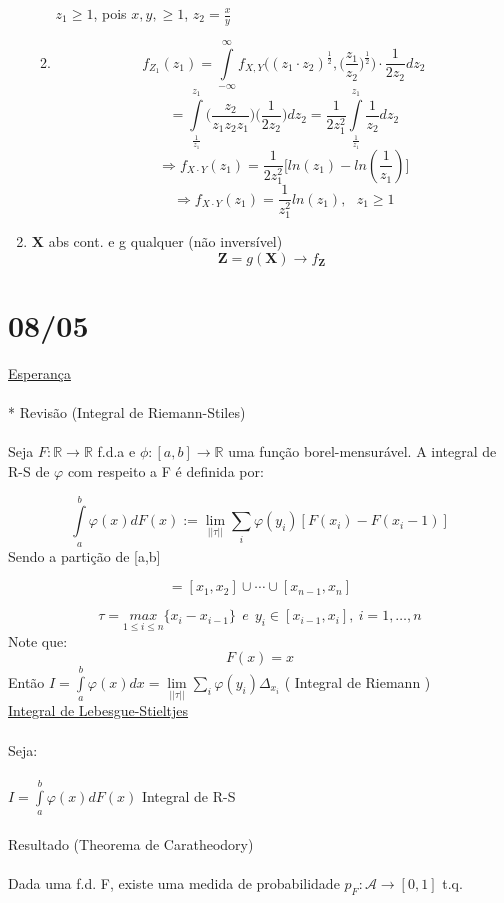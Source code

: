 \documentclass[a4paper,12pt]{article}
\begin{document}
\begin{enumerate}
\begin{enumerate}[label=\alph*)]
	$z_1\ge 1$, pois $x,y,\ge1$, $z_2=\frac{x}{y}$
	\item 
	$$f_{Z_1}(z_1)= \int\limits_{-\infty}^{\infty}f_{X,Y}\bigg(
	(z_1\cdot z_2)^{\frac{1}{2}},\bigg(\frac{z_1}{z_2}\bigg)^{\frac{1}{2}}
	\bigg)\cdot 
	\frac{1}{2z_2}dz_2
$$
$$
=\int\limits_{\frac{1}{z_1}}^{z_1} \bigg(
	\frac{z_2}{z_1z_2z_1}
	\bigg)
	\bigg(
	\frac{1}{2z_2}
	\bigg)
	dz_2=\frac{1}{2z_1^2}\int\limits_{\frac{1}{z_1}}^{z_1}\frac{1}{z_2}dz_2
$$
$$\Rightarrow f_{X\cdot Y}(z_1)= \frac{1}{2z_1^2}\bigg[ln(z_1)-ln(\frac{1}{z_1})\bigg] $$
$$\Rightarrow f_{X\cdot Y}(z_1)= \frac{1}{z_1^2}ln(z_1), \ \ \ z_1\ge 1 $$
		 \end{enumerate}
		 \item $\bm X$ abs cont. e g qualquer (não inversível)
		 $$ \bm Z=g(\bm X) \rightarrow f_{\bm Z} $$
		 
	\end{enumerate}



\newpage 

\section*{08/05}
\underline{Esperança}\\
\\
* Revisão (Integral de Riemann-Stiles)\\
\\
Seja $F:\mathbb R \longrightarrow \mathbb R$ f.d.a e $\phi: [a,b]\longrightarrow \mathbb R$ uma função borel-mensurável. A integral de R-S de $\varphi$ com respeito a F é definida por:

$$\int\limits_a^b \varphi(x)dF(x)
:= \lim\limits_{||\tau||} \sum\limits_i \varphi(y_i)[F(x_i)-F(x_i-1)]
 $$
 Sendo a partição de [a,b]
 
 $$=[x_1,x_2]\cup\cdots\cup[x_{n-1},x_n] $$
 
 $$\tau = \underset{1\le i\le n}{max} \{x_i-x_{i-1}\} \ \ e \ \ y_i \in [x_{i-1},x_i], \ i=1,\ldots,n$$
 Note que:
 $$F(x)=x $$
 Então
 $I=\int\limits_a^b \varphi(x)dx =\lim\limits_{||\tau||} \sum\limits_i \varphi(y_i)\Delta_{x_i}$ \bigg(
 Integral de Riemann
 \bigg)\\
\newpage 
 \underline{Integral de Lebesgue-Stieltjes}\\
 \\
 Seja:\\
 \\
 
$I = \int\limits_a^b \varphi(x)dF(x)$ Integral de R-S\\
\\
Resultado (Theorema de Caratheodory) \\
\\
Dada uma f.d. F, existe uma medida de probabilidade
$p_F: \mathscr A \longrightarrow [0,1] $ t.q.
\end{document}
